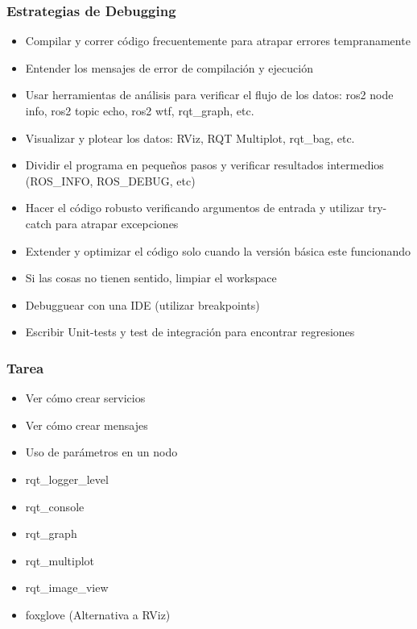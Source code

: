 \begin{frame}
    \frametitle{Estrategias de Debugging}
    
    \begin{itemize}
        \item Compilar y correr código frecuentemente para atrapar errores tempranamente
        \item Entender los mensajes de error de compilación y ejecución
        \item Usar herramientas de análisis para verificar el flujo de los datos: ros2 node info, ros2 topic echo, ros2 wtf, rqt\_graph, etc.
        \item Visualizar y plotear los datos: RViz, RQT Multiplot, rqt\_bag, etc.
        \item Dividir el programa en pequeños pasos y verificar resultados intermedios (ROS\_INFO, ROS\_DEBUG, etc)
        \item Hacer el código robusto verificando argumentos de entrada y utilizar try-catch para atrapar excepciones
        \item Extender y optimizar el código solo cuando la versión básica este funcionando
        \item Si las cosas no tienen sentido, limpiar el workspace
        \item Debugguear con una IDE (utilizar breakpoints)
        \item Escribir Unit-tests y test de integración para encontrar regresiones
    \end{itemize}
    
\end{frame}

\begin{frame}
	\frametitle{Tarea}
	
	\begin{itemize}
		\item Ver cómo crear servicios
		\item Ver cómo crear mensajes
		\item Uso de parámetros en un nodo
		\item rqt\_logger\_level
		\item rqt\_console
		\item rqt\_graph
		\item rqt\_multiplot
		\item rqt\_image\_view
        \item foxglove (Alternativa a RViz)
	\end{itemize}
	
\end{frame}


